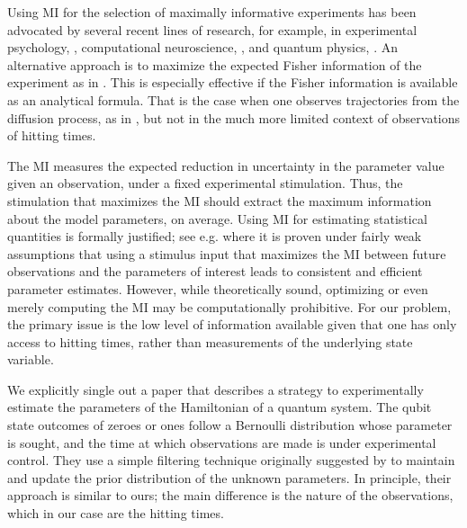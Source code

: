 \documentclass[12pt]{article}
\begin{document}
Using MI for the selection of maximally informative experiments has been
advocated by several recent lines of research, for example, in experimental
psychology, \cite{Cavagnaro2010,Myung2013}, computational neuroscience,
\cite{Paninski2006a,Paninski2005,Lewi2009}, and quantum physics,
\cite{Granade2012}. An alternative approach is to maximize the expected Fisher
information of the experiment as in \cite{Hooker2015}. This is especially
effective if the Fisher information is available as an analytical formula. That
is the case when one observes trajectories from the diffusion process, as in
\cite{Hooker2015}, but not in the much more limited context of observations of
hitting times.
 
The MI measures the expected reduction in uncertainty in the parameter value
given an observation, under a fixed experimental stimulation. Thus, the
stimulation that maximizes the MI should extract the maximum information about
the model parameters, on average. Using MI for estimating statistical quantities
is formally justified; see e.g. \cite{Paninski2005} where it is proven under
fairly weak assumptions that using a stimulus input that maximizes the MI
between future observations and the parameters of interest leads to consistent
and efficient parameter estimates. However, while theoretically sound,
optimizing or even merely computing the MI may be computationally prohibitive.
For our problem, the primary issue is the low level of information available
given that one has only access to hitting times, rather than measurements of the
underlying state variable.

We explicitly single out a paper \cite{Granade2012} that describes a strategy to
experimentally estimate the parameters of the Hamiltonian of a quantum system.
The qubit state outcomes of zeroes or ones follow a Bernoulli distribution whose
parameter is sought, and the time at which observations are made is under
experimental control. They use a simple filtering technique originally suggested
by \cite{Liu2001} to maintain and update the prior distribution of the unknown
parameters. In principle, their approach is similar to ours; the main difference
is the nature of the observations, which in our case are the hitting times.
\end{document}
